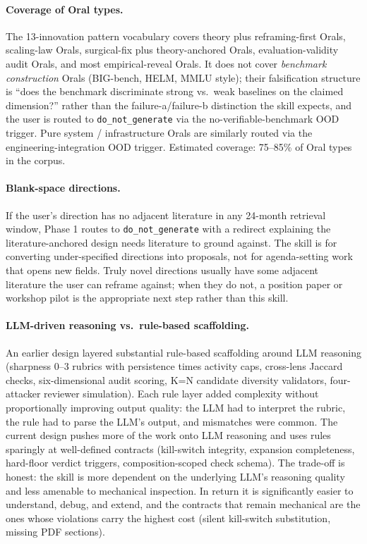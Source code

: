 \documentclass[10pt,a4paper]{article}
\begin{document}
\paragraph{Coverage of Oral types.} The 13-innovation pattern vocabulary covers theory plus reframing-first Orals, scaling-law Orals, surgical-fix plus theory-anchored Orals, evaluation-validity audit Orals, and most empirical-reveal Orals. It does not cover \emph{benchmark construction} Orals (BIG-bench, HELM, MMLU style); their falsification structure is ``does the benchmark discriminate strong vs.\ weak baselines on the claimed dimension?'' rather than the failure-a/failure-b distinction the skill expects, and the user is routed to \texttt{do\_not\_generate} via the no-verifiable-benchmark OOD trigger. Pure system / infrastructure Orals are similarly routed via the engineering-integration OOD trigger. Estimated coverage: 75--85\% of Oral types in the corpus.

\paragraph{Blank-space directions.} If the user's direction has no adjacent literature in any 24-month retrieval window, Phase 1 routes to \texttt{do\_not\_generate} with a redirect explaining the literature-anchored design needs literature to ground against. The skill is for converting under-specified directions into proposals, not for agenda-setting work that opens new fields. Truly novel directions usually have some adjacent literature the user can reframe against; when they do not, a position paper or workshop pilot is the appropriate next step rather than this skill.

\paragraph{LLM-driven reasoning vs.\ rule-based scaffolding.} An earlier design layered substantial rule-based scaffolding around LLM reasoning (sharpness 0--3 rubrics with persistence times activity caps, cross-lens Jaccard checks, six-dimensional audit scoring, K=N candidate diversity validators, four-attacker reviewer simulation). Each rule layer added complexity without proportionally improving output quality: the LLM had to interpret the rubric, the rule had to parse the LLM's output, and mismatches were common. The current design pushes more of the work onto LLM reasoning and uses rules sparingly at well-defined contracts (kill-switch integrity, expansion completeness, hard-floor verdict triggers, composition-scoped check schema). The trade-off is honest: the skill is more dependent on the underlying LLM's reasoning quality and less amenable to mechanical inspection. In return it is significantly easier to understand, debug, and extend, and the contracts that remain mechanical are the ones whose violations carry the highest cost (silent kill-switch substitution, missing PDF sections).
\end{document}
